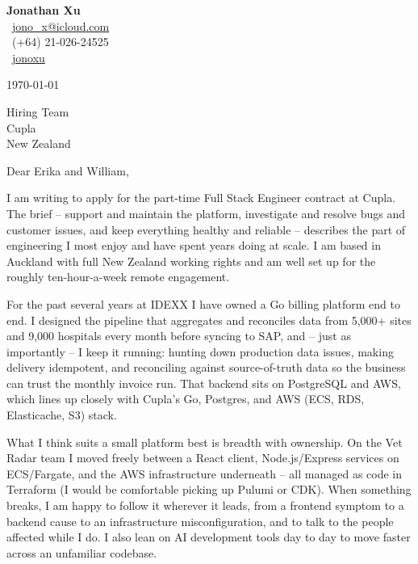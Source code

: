 \documentclass[11pt,a4paper]{article}
\begin{document}
\begin{flushright}
{\Large\textbf{Jonathan Xu}}\\[0.3em]
\faEnvelope\ \href{mailto:jono_x@icloud.com}{jono\_x@icloud.com} \\
\faPhone\ (+64) 21-026-24525 \\
\faLinkedin\ \href{https://www.linkedin.com/in/jonathan-x-4aba55115}{jonoxu}
\end{flushright}

\vspace{0.5em}

\today

\vspace{0.5em}

Hiring Team \\
Cupla \\
New Zealand

\vspace{0.5em}

Dear Erika and William,

I am writing to apply for the part-time Full Stack Engineer contract at Cupla. The brief -- support and maintain the platform, investigate and resolve bugs and customer issues, and keep everything healthy and reliable -- describes the part of engineering I most enjoy and have spent years doing at scale. I am based in Auckland with full New Zealand working rights and am well set up for the roughly ten-hour-a-week remote engagement.

For the past several years at IDEXX I have owned a Go billing platform end to end. I designed the pipeline that aggregates and reconciles data from 5,000+ sites and 9,000 hospitals every month before syncing to SAP, and -- just as importantly -- I keep it running: hunting down production data issues, making delivery idempotent, and reconciling against source-of-truth data so the business can trust the monthly invoice run. That backend sits on PostgreSQL and AWS, which lines up closely with Cupla's Go, Postgres, and AWS (ECS, RDS, Elasticache, S3) stack.

What I think suits a small platform best is breadth with ownership. On the Vet Radar team I moved freely between a React client, Node.js/Express services on ECS/Fargate, and the AWS infrastructure underneath -- all managed as code in Terraform (I would be comfortable picking up Pulumi or CDK). When something breaks, I am happy to follow it wherever it leads, from a frontend symptom to a backend cause to an infrastructure misconfiguration, and to talk to the people affected while I do. I also lean on AI development tools day to day to move faster across an unfamiliar codebase.
\end{document}
